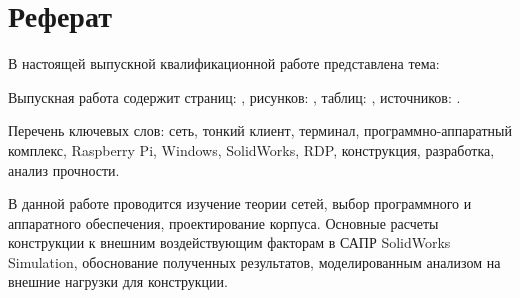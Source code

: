 \chapter*{Реферат}

В настоящей выпускной квалификационной работе представлена тема:

Выпускная работа содержит страниц: \pageref{LastPage}, рисунков: \totalfigures,
таблиц: \totaltables, источников: .

Перечень ключевых слов: сеть, тонкий клиент, терминал, программно-аппаратный комплекс,
Raspberry Pi, Windows, SolidWorks, RDP, конструкция, разработка, анализ прочности.

В данной работе проводится изучение теории сетей, выбор программного и аппаратного
обеспечения, проектирование корпуса.  Основные расчеты конструкции к внешним
воздействующим факторам в САПР SolidWorks Simulation, обоснование полученных
результатов, моделированным анализом на внешние нагрузки для конструкции.
